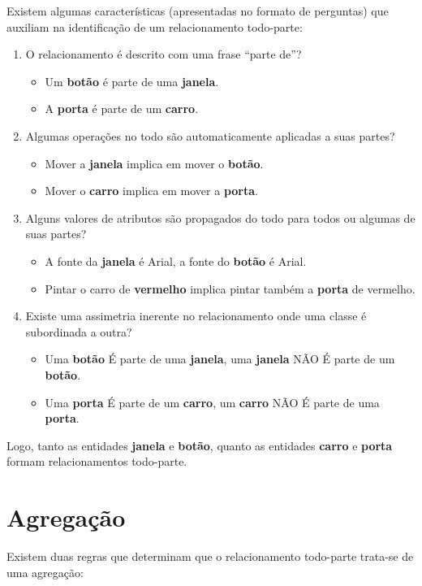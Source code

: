 Existem algumas características (apresentadas no formato de perguntas) que auxiliam na identificação de um relacionamento todo-parte:

\begin{enumerate}
\item O relacionamento é descrito com uma frase ``parte de''?
	\begin{itemize}
		\item Um \textbf{botão} é parte de uma \textbf{janela}.
		\item A \textbf{porta} é parte de um \textbf{carro}.
	\end{itemize}
	
\item Algumas operações no todo são automaticamente aplicadas a suas partes?
\begin{itemize}
	\item Mover a \textbf{janela} implica em mover o \textbf{botão}.
	\item Mover o \textbf{carro} implica em mover a \textbf{porta}.
\end{itemize}

\item Alguns valores de atributos são propagados do todo para todos ou algumas de suas partes?
\begin{itemize}
	\item A fonte da \textbf{janela} é Arial, a fonte do \textbf{botão} é Arial.
	\item Pintar o carro de \textbf{vermelho} implica pintar também a \textbf{porta} de vermelho.
\end{itemize}

\item Existe uma assimetria inerente no relacionamento onde uma classe é subordinada a outra?
\begin{itemize}
	\item Uma \textbf{botão} É parte de uma \textbf{janela}, uma \textbf{janela} NÃO É parte de um \textbf{botão}.
	\item Uma \textbf{porta} É parte de um \textbf{carro}, um \textbf{carro} NÃO É parte de uma \textbf{porta}.
\end{itemize}
\end{enumerate}

Logo, tanto as entidades \textbf{janela} e \textbf{botão}, quanto as entidades \textbf{carro} e \textbf{porta} formam relacionamentos todo-parte.


\section{Agregação}
Existem duas regras que determinam que o relacionamento todo-parte trata-se de uma agregação:

